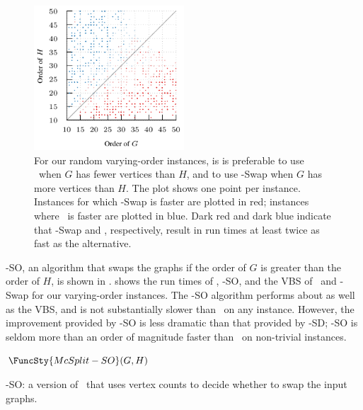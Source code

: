 \begin{figure}[h!]
    \centering
    \includegraphics*[width=0.5\textwidth]{14-mcsplit-i-undirected/modified-mcsplit-experiment/plots/plots/order-when-swap}
    \caption{For our random varying-order instances, is is preferable to use \McSplit\ when $G$
        has fewer vertices than $H$, and to use \McSplit-Swap when $G$ has more vertices than $H$.
        The plot shows one point per instance.  Instances for which \McSplit-Swap
        is faster are plotted in red; instances where \McSplit\ is faster
        are plotted in blue.  Dark red and dark blue indicate that \McSplit-Swap and \McSplit,
        respectively, result in run times at least twice as fast as the alternative.}
    \label{figure:order-when-swap}
\end{figure}

\McSplit-SO, an algorithm that swaps the graphs if the order of $G$ is greater
than the order of $H$, is shown in .
 shows the run times of \McSplit,
\McSplit-SO, and the VBS of \McSplit\ and \McSplit-Swap for our varying-order
instances.  The \McSplit-SO
algorithm performs about as well as the VBS, and is not substantially slower
than \McSplit\ on any instance.  However, the improvement provided by
\McSplit-SO is less dramatic than that provided by \McSplit-SD; \McSplit-SO is
seldom more than an order of magnitude faster than \McSplit\ on non-trivial
instances.

\begin{algorithm}[h!]
\DontPrintSemicolon
\nl $\FuncSty{McSplit-SO}(G, H)$ \label{McSplitSOFun} \;
\nl {}
    \caption{\McSplit-SO: a version of \McSplit\ that uses vertex counts to decide whether to swap the input graphs.} 
\label{McSplitSOAlg}
\end{algorithm}

